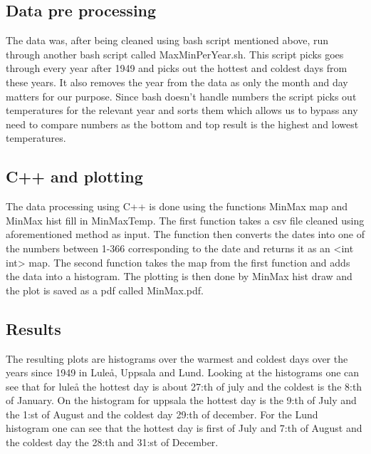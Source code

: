 \documentclass[aps,prl,groupedaddress,twocolumn]{revtex4-1}
\begin{document}
\subsection{Data pre processing}
 The data was, after being cleaned using bash script mentioned above, run through another bash script called MaxMinPerYear.sh. This script picks goes through every year after 1949 and picks out the hottest and coldest days from these years. It also removes the year from the data as only the month and day matters for our purpose. Since bash doesn't handle numbers the script picks out temperatures for the relevant year and sorts them which allows us to bypass any need to compare numbers as the bottom and top result is the highest and lowest temperatures.
 \vspace{-0.5cm}

 \subsection{C++ and plotting}
The data processing using C++ is done using the functions MinMax map and MinMax hist fill in
MinMaxTemp. The first function takes a csv file cleaned using aforementioned method as input. The function then converts the dates into one of the numbers between 1-366 corresponding to the date and returns it as an <int int> map. The second function takes the map from the first function and adds the data into a histogram. The plotting is then done by MinMax hist draw and the plot is saved as a pdf called MinMax.pdf. 
\vspace{-0.3cm}
 
 \subsection{Results}
The resulting plots are histograms over the warmest and coldest days over the years since 1949 in Luleå, Uppsala and Lund. Looking at the histograms one can see that for luleå the hottest day is about 27:th of july and the coldest is the 8:th of January. On the histogram for uppsala the hottest day is the 9:th of July and the 1:st of August and the coldest day 29:th of december. For the Lund histogram one can see that the hottest day is first of July and 7:th of August and the coldest day the 28:th and 31:st of December.
\vspace{-0.4cm}
\end{document}
